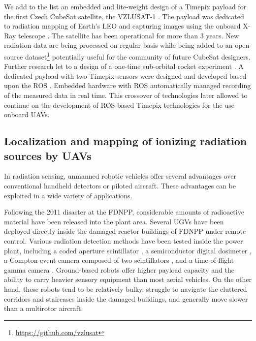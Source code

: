 \documentclass[a4paper,11pt,twoside,openright]{book}
\begin{document}

We add to the list an embedded and lite-weight design of a Timepix payload for the first Czech CubeSat satellite, the VZLUSAT-1 \cite{urban2017vzlusat, daniel2019inorbit}.
The payload was dedicated to radiation mapping of Earth's \ac{LEO} \cite{baca2018timepix} and capturing images using the onboard X-Ray telescope \cite{baca2016miniaturized}.
The satellite has been operational for more than 3 years.
New radiation data are being processed on regular basis while being added to an open-source dataset\footnote{\url{https://github.com/vzlusat}} potentially useful for the community of future CubeSat designers.
Further research let to a design of a one-time sub-orbital rocket experiment \cite{daniel2017xray, urban2020rex}.
A dedicated payload with two Timepix sensors were designed and developed based upon the \acl{ROS} \cite{baca2018rospix}.
Embedded hardware with \ac{ROS} automatically managed recording of the measured data in real time.
This crossover of technologies later allowed to continue on the development of \ac{ROS}-based Timepix technologies for the use onboard \aclp{UAV}.



\subsection{Localization and mapping of ionizing radiation sources by \acp{UAV}}

In radiation sensing, unmanned robotic vehicles offer several advantages over conventional handheld detectors or piloted aircraft.
These advantages can be exploited in a wide variety of applications.

Following the 2011 disaster at the \ac{FDNPP}, considerable amounts of radioactive material have been released into the plant area.
Several \acp{UGV} have been deployed directly inside the damaged reactor buildings of \ac{FDNPP} under remote control.
Various radiation detection methods have been tested inside the power plant, including a coded aperture scintillator \cite{ohno2011robotic}, a semiconductor digital dosimeter \cite{nagatani2013emergency}, a Compton event camera composed of two scintillators \cite{sato2019radiation}, and a time-of-flight gamma camera \cite{kinoshita2014development}.
Ground-based robots offer higher payload capacity and the ability to carry heavier sensory equipment than most aerial vehicles.
On the other hand, these robots tend to be relatively bulky, struggle to navigate the cluttered corridors and staircases inside the damaged buildings, and generally move slower than a multirotor aircraft.
\end{document}
